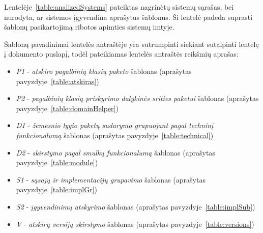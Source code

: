 Lentelėje~\ref{table:analizedSystems} pateiktas nagrinėtų sistemų sąrašas, bei nurodyta, ar sistemos įgyvendina aprašytus šablonus.
Ši lentelė padeda suprasti šablonų pasikartojimą ribotos apimties sistemų imtyje.

Šablonų pavadinimai lentelės antraštėje yra sutrumpinti siekiant sutalpinti lentelę į dokumento puslapį, todėl pateikiamas lentelės antraštės reikšmių aprašas:
\begin{itemize}
    \item \textit{P1} - \textit{atskiro pagalbinių klasių paketo} šablonas (aprašytas pavyzdyje~\ref{table:atskiras})
    \item \textit{P2} - \textit{pagalbinių klasių priskyrimo dalykinės srities paketui} šablonas (aprašytas pavyzdyje~\ref{table:domainHelper})
    \item \textit{D1} - \textit{žemesnio lygio paketų sudarymo grupuojant pagal techninį funkcionalumą} šablonas (aprašytas pavyzdyje~\ref{table:technical})
    \item \textit{D2} - \textit{skirstymo pagal smulkų funkcionalumą} šablonas (aprašytas pavyzdyje~\ref{table:module})
    \item \textit{S1} - \textit{sąsajų ir implementacijų grupavimo} šablonas (aprašytas pavyzdyje~\ref{table:implGr})
    \item \textit{S2} - \textit{įgyvendinimų atskyrimo} šablonas (aprašytas pavyzdyje~\ref{table:implSub})
    \item \textit{V} - \textit{atskirų versijų skirstymo} šablonas (aprašytas pavyzdyje~\ref{table:versions})
\end{itemize}

